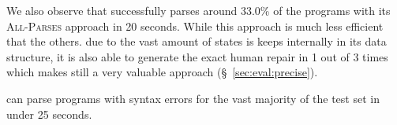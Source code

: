 We also observe that \toolname successfully parses around 33.0\% of the programs
with its \textsc{All-Parses} approach in 20 seconds. While this approach is much
less efficient that the others. due to the vast amount of states is keeps
internally in its data structure, it is also able to generate the exact human
repair in 1 out of 3 times which makes still a very valuable approach
(\S~\ref{sec:eval:precise}).

\begin{framed}
  \noindent \toolname can parse programs with syntax errors for the vast
  majority of the test set in under 25 seconds.
\end{framed}
